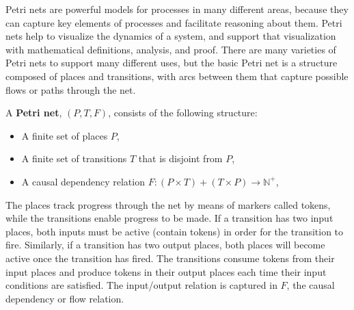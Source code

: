 Petri nets are powerful models for processes in many different areas, because they can capture key elements of processes and facilitate reasoning about them. Petri nets help to visualize the dynamics of a system, and support that visualization with mathematical definitions, analysis, and proof. There are many varieties of Petri nets to support many different uses, but the basic Petri net is a structure composed of places and transitions, with arcs between them that capture possible flows or paths through the net. 
\begin{definition}
  \label{def:Original-Petri-Net}
A \textbf{Petri net}, $(P, T, F)$, consists of the following structure:  
  \begin{itemize}
  \item A finite set of places $P$,
  \item A finite set of transitions $T$ that is disjoint from $P$,
  \item A causal dependency relation $F: (P \times T) + (T \times P) \to \mathbb{N}^+ $, 
  \end{itemize}
\end{definition}
The places track progress through the net by means of markers called tokens, while the transitions enable progress to be made. If a transition has two input places, both inputs must be active (contain tokens) in order for the transition to fire. Similarly, if a transition has two output places, both places will become active once the transition has fired. The transitions consume tokens from their input places and produce tokens in their output places each time their input conditions are satisfied. The input/output relation is captured in $F$, the causal dependency or flow relation. 
